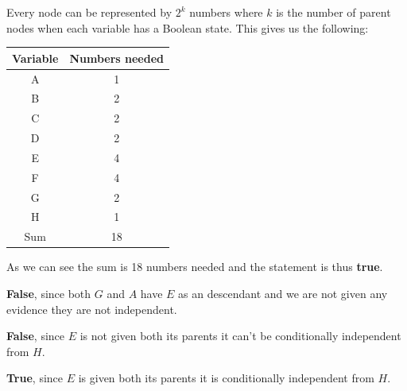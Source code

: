 \documentclass[10pt, a4paper, english]{../Template/NTNUoving}
\begin{document}
\begin{oppgave}
    \begin{punkt}
        Every node can be represented by $2^k$ numbers where $k$ is the number of parent nodes when each variable has a Boolean state.
        This gives us the following:
        \begin{center}
            \begin{tabular}{ |c|c| }
             \hline
             Variable & Numbers needed \\
             \hline
             A  & 1 \\
             \hline
             B &  2 \\
             \hline
             C &  2 \\
             \hline
             D &  2 \\
             \hline
             E &  4 \\
             \hline
             F &  4 \\
             \hline
             G &  2 \\
             \hline
             H &  1 \\
             \hline
             Sum &  18 \\
             \hline
            \end{tabular}
            \end{center}
            As we can see the sum is 18 numbers needed and the statement is thus \textbf{true}.
    \end{punkt}

    \begin{punkt}
        \textbf{False}, since both $G$ and $A$ have $E$ as an descendant and we are not given any evidence they are not independent.
    \end{punkt}

    \begin{punkt}
        \textbf{False}, since $E$ is not given both its parents it can't be conditionally independent from $H$.
    \end{punkt}

    \begin{punkt}
        \textbf{True}, since $E$ is given both its parents it is conditionally independent from $H$.
    \end{punkt}
\end{oppgave}
\end{document}
